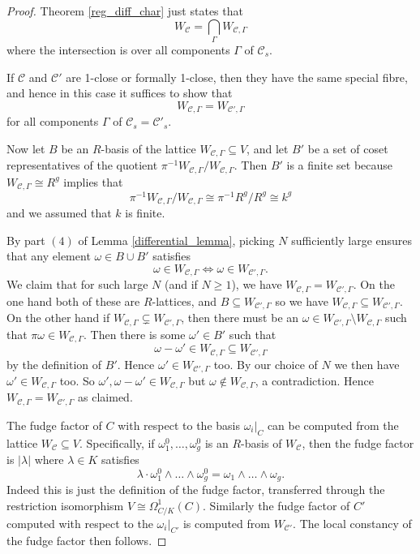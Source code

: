 \documentclass{article}
\theoremstyle{definition}
\theoremstyle{plain}
\theoremstyle{remark}
\begin{document}
	\begin{proof}
		Theorem \ref{reg_diff_char} just states that
		\[W_{\mathcal{C}} = \bigcap_{\Gamma} W_{\mathcal{C}, \Gamma}\]
		where the intersection is over all components $\Gamma$ of $\mathcal{C}_s$.
		
		If $\mathcal{C}$ and $\mathcal{C'}$ are 1-close or formally 1-close, then they have the same special fibre, and hence in this case it suffices to show that 
		\[W_{\mathcal{C}, \Gamma} = W_{\mathcal{C'}, \Gamma}\]
		for all components $\Gamma$ of $\mathcal{C}_s = \mathcal{C}'_s$.
		
		
		Now let $B$ be an $R$-basis of the lattice $W_{\mathcal{C}, \Gamma}\subseteq V$, and let $B'$ be a set of coset representatives of the quotient $\pi^{-1}W_{\mathcal{C}, \Gamma}/W_{\mathcal{C}, \Gamma}$. Then $B'$ is a finite set because $W_{\mathcal{C}, \Gamma}\cong R^g$ implies that
		\[\pi^{-1}W_{\mathcal{C}, \Gamma}/W_{\mathcal{C}, \Gamma}\cong \pi^{-1}R^g/R^g\cong k^g\]
		and we assumed that $k$ is finite.
		
		By part $(4)$ of Lemma \ref{differential_lemma}, picking $N$ sufficiently large ensures that any element $\omega\in B\cup B'$ satisfies
		\[\omega \in W_{\mathcal{C}, \Gamma} \iff \omega \in W_{\mathcal{C}', \Gamma}.\]
		We claim that for such large $N$ (and if $N\ge 1$), we have $W_{\mathcal{C}, \Gamma} = W_{\mathcal{C'}, \Gamma}$. On the one hand both of these are $R$-lattices, and $B\subseteq W_{\mathcal{C'}, \Gamma}$ so we have $W_{\mathcal{C}, \Gamma}\subseteq W_{\mathcal{C'}, \Gamma}$. On the other hand if $W_{\mathcal{C}, \Gamma}\subsetneq W_{\mathcal{C'}, \Gamma}$, then there must be an $\omega\in W_{\mathcal{C'},\Gamma}\setminus W_{\mathcal{C}, \Gamma}$ such that $\pi\omega \in W_{\mathcal{C}, \Gamma}$. Then there is some $\omega'\in B'$ such that 
		\[\omega- \omega' \in W_{\mathcal{C}, \Gamma}\subseteq W_{\mathcal{C'}, \Gamma}\]
		by the definition of $B'$. Hence $\omega'\in W_{\mathcal{C'}, \Gamma}$ too. By our choice of $N$ we then have $\omega'\in W_{\mathcal{C}, \Gamma}$ too. So $\omega', \omega-\omega'\in W_{\mathcal{C}, \Gamma}$ but $\omega\not\in W_{\mathcal{C}, \Gamma}$, a contradiction. Hence $W_{\mathcal{C}, \Gamma} = W_{\mathcal{C}', \Gamma}$ as claimed.
		
		The fudge factor of $C$ with respect to the basis $\omega_i|_C$ can be computed from the lattice $W_{\mathcal{C}}\subseteq V$. Specifically, if $\omega_1^0, \ldots, \omega_g^0$ is an $R$-basis of $W_{\mathcal{C}}$, then the fudge factor is $|\lambda|$ where $\lambda\in K$ satisfies
		\[\lambda \cdot \omega_1^0\wedge \ldots \wedge \omega_g^0 = \omega_1\wedge \ldots \wedge \omega_g.\]
		Indeed this is just the definition of the fudge factor, transferred through the restriction isomorphism $V\cong \Omega^1_{C/K}(C)$. Similarly the fudge factor of $C'$ computed with respect to the $\omega_i|_{C'}$ is computed from $W_{\mathcal{C}'}$. The local constancy of the fudge factor then follows.
	\end{proof}	
\end{document}
